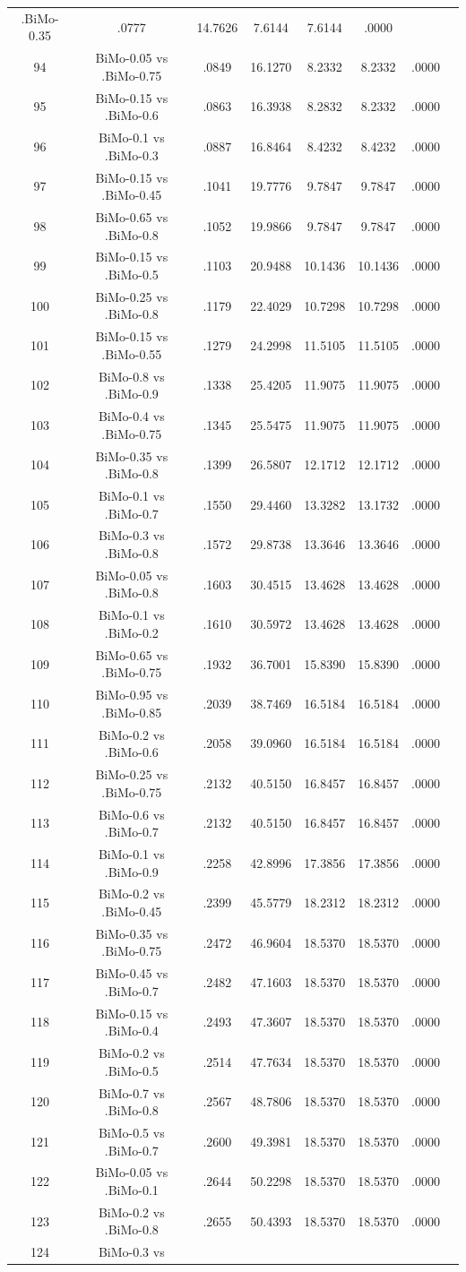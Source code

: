 \documentclass[a4paper,10pt]{article}
\begin{document}
\begin{landscape}
\begin{table}[!htp]
\begin{tabular}{cccccccc}
.BiMo-0.35&.0777&14.7626&7.6144&7.6144&.0000\\94&BiMo-0.05 vs .BiMo-0.75&.0849&16.1270&8.2332&8.2332&.0000\\95&BiMo-0.15 vs .BiMo-0.6&.0863&16.3938&8.2832&8.2332&.0000\\96&BiMo-0.1 vs .BiMo-0.3&.0887&16.8464&8.4232&8.4232&.0000\\97&BiMo-0.15 vs .BiMo-0.45&.1041&19.7776&9.7847&9.7847&.0000\\98&BiMo-0.65 vs .BiMo-0.8&.1052&19.9866&9.7847&9.7847&.0000\\99&BiMo-0.15 vs .BiMo-0.5&.1103&20.9488&10.1436&10.1436&.0000\\100&BiMo-0.25 vs .BiMo-0.8&.1179&22.4029&10.7298&10.7298&.0000\\101&BiMo-0.15 vs .BiMo-0.55&.1279&24.2998&11.5105&11.5105&.0000\\102&BiMo-0.8 vs .BiMo-0.9&.1338&25.4205&11.9075&11.9075&.0000\\103&BiMo-0.4 vs .BiMo-0.75&.1345&25.5475&11.9075&11.9075&.0000\\104&BiMo-0.35 vs .BiMo-0.8&.1399&26.5807&12.1712&12.1712&.0000\\105&BiMo-0.1 vs .BiMo-0.7&.1550&29.4460&13.3282&13.1732&.0000\\106&BiMo-0.3 vs .BiMo-0.8&.1572&29.8738&13.3646&13.3646&.0000\\107&BiMo-0.05 vs .BiMo-0.8&.1603&30.4515&13.4628&13.4628&.0000\\108&BiMo-0.1 vs .BiMo-0.2&.1610&30.5972&13.4628&13.4628&.0000\\109&BiMo-0.65 vs .BiMo-0.75&.1932&36.7001&15.8390&15.8390&.0000\\110&BiMo-0.95 vs .BiMo-0.85&.2039&38.7469&16.5184&16.5184&.0000\\111&BiMo-0.2 vs .BiMo-0.6&.2058&39.0960&16.5184&16.5184&.0000\\112&BiMo-0.25 vs .BiMo-0.75&.2132&40.5150&16.8457&16.8457&.0000\\113&BiMo-0.6 vs .BiMo-0.7&.2132&40.5150&16.8457&16.8457&.0000\\114&BiMo-0.1 vs .BiMo-0.9&.2258&42.8996&17.3856&17.3856&.0000\\115&BiMo-0.2 vs .BiMo-0.45&.2399&45.5779&18.2312&18.2312&.0000\\116&BiMo-0.35 vs .BiMo-0.75&.2472&46.9604&18.5370&18.5370&.0000\\117&BiMo-0.45 vs .BiMo-0.7&.2482&47.1603&18.5370&18.5370&.0000\\118&BiMo-0.15 vs .BiMo-0.4&.2493&47.3607&18.5370&18.5370&.0000\\119&BiMo-0.2 vs .BiMo-0.5&.2514&47.7634&18.5370&18.5370&.0000\\120&BiMo-0.7 vs .BiMo-0.8&.2567&48.7806&18.5370&18.5370&.0000\\121&BiMo-0.5 vs .BiMo-0.7&.2600&49.3981&18.5370&18.5370&.0000\\122&BiMo-0.05 vs .BiMo-0.1&.2644&50.2298&18.5370&18.5370&.0000\\123&BiMo-0.2 vs .BiMo-0.8&.2655&50.4393&18.5370&18.5370&.0000\\124&BiMo-0.3 vs 
\end{tabular}
\end{table}
\end{landscape}
\end{document}
